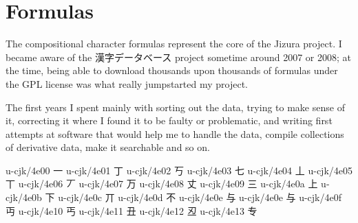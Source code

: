 
\FPmul{}%
\FPmul{}\begin{multicols}{2}\end{multicols}
\section{Formulas
}
\begin{multicols}{2}The compositional character formulas represent the core of the Jizura project.
I became aware of the {\cjk{}漢字{\ka{}データベース} }project sometime around 2007 or
2008; at the time, being able to download thousands upon thousands
of formulas under the GPL license was what really jumpstarted my project.\mktsShowpar\par
The first years I spent mainly with sorting out the data, trying to make
sense of it, correcting it where I found it to be faulty or problematic,
and writing first attempts at software that would help me to handle
the data, compile collections of derivative data, make it searchable
and so on.\mktsShowpar\par
\begingroup\mktsObeyAllLines{}

\begingroup\mktsStyleCode{}u-cjk/4e00	{\cjk{}一}	 
u-cjk/4e01	{\cjk{}丁}	 
u-cjk/4e02	{\cjk{}丂}	 
u-cjk/4e03	{\cjk{}七}	 
u-cjk/4e04	{\cjk{}丄}	 
u-cjk/4e05	{\cjk{}丅}	 
u-cjk/4e06	{\cjk{}丆}	 
u-cjk/4e07	{\cjk{}万}	 
u-cjk/4e08	{\cjk{}丈}	 
u-cjk/4e09	{\cjk{}三}	 
u-cjk/4e0a	{\cjk{}上}	 
u-cjk/4e0b	{\cjk{}下}	 
u-cjk/4e0c	{\cjk{}丌}	 
u-cjk/4e0d	{\cjk{}不}	 
u-cjk/4e0e	{\cjk{}与}	 
u-cjk/4e0e	{\cjk{}与}	 
u-cjk/4e0f	{\cjk{}丏}	 
u-cjk/4e10	{\cjk{}丐}	 
u-cjk/4e11	{\cjk{}丑}	 
u-cjk/4e12	{\cjk{}丒}	 
u-cjk/4e13	{\cjk{}专}	 
 

\end{multicols}
